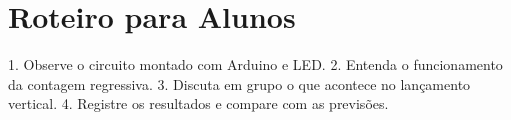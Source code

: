 \documentclass{article}
\begin{document}
\section*{Roteiro para Alunos}

1. Observe o circuito montado com Arduino e LED.
2. Entenda o funcionamento da contagem regressiva.
3. Discuta em grupo o que acontece no lançamento vertical.
4. Registre os resultados e compare com as previsões.
\end{document}
